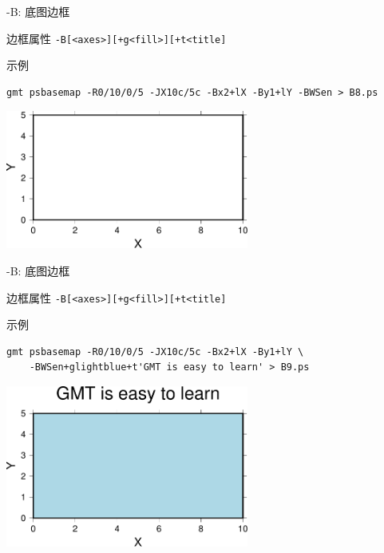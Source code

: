 \documentclass[UTF8, 11pt]{ctexbeamer}
\begin{document}
\begin{frame}[fragile]{-B: 底图边框}
\begin{block}{边框属性}
\small{\verb!-B[<axes>][+g<fill>][+t<title]!}
\end{block}
\begin{block}{示例}
\centering
\small\begin{verbatim}
gmt psbasemap -R0/10/0/5 -JX10c/5c -Bx2+lX -By1+lY -BWSen > B8.ps
\end{verbatim}
\includegraphics[width=0.6\textwidth]{GMT_B_example_8}
\end{block}
\end{frame}

\begin{frame}[fragile]{-B: 底图边框}
\begin{block}{边框属性}
\small{\verb!-B[<axes>][+g<fill>][+t<title]!}
\end{block}
\begin{block}{示例}
\centering
\small\begin{verbatim}
gmt psbasemap -R0/10/0/5 -JX10c/5c -Bx2+lX -By1+lY \
    -BWSen+glightblue+t'GMT is easy to learn' > B9.ps
\end{verbatim}
\includegraphics[width=0.6\textwidth]{GMT_B_example_9}
\end{block}
\end{frame}
\end{document}
